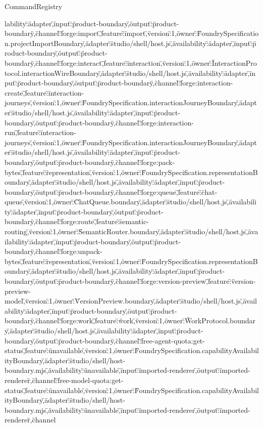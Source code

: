\begin{lexlean}{CommandRegistry}
\begin{semanticmodule}
{lability\":\"adapter\",\"input\":\"product-boundary\",\"output\":\"product-boundary\"},{\"channel\":\"forge:import\",\"feature\":\"import\",\"version\":1,\"owner\":\"FoundrySpecification.projectImportBoundary\",\"adapter\":\"studio/shell/host.js\",\"availability\":\"adapter\",\"input\":\"product-boundary\",\"output\":\"product-boundary\"},{\"channel\":\"forge:interact\",\"feature\":\"interaction\",\"version\":1,\"owner\":\"InteractionProtocol.interactionWireBoundary\",\"adapter\":\"studio/shell/host.js\",\"availability\":\"adapter\",\"input\":\"product-boundary\",\"output\":\"product-boundary\"},{\"channel\":\"forge:interaction-create\",\"feature\":\"interaction-journeys\",\"version\":1,\"owner\":\"FoundrySpecification.interactionJourneyBoundary\",\"adapter\":\"studio/shell/host.js\",\"availability\":\"adapter\",\"input\":\"product-boundary\",\"output\":\"product-boundary\"},{\"channel\":\"forge:interaction-run\",\"feature\":\"interaction-journeys\",\"version\":1,\"owner\":\"FoundrySpecification.interactionJourneyBoundary\",\"adapter\":\"studio/shell/host.js\",\"availability\":\"adapter\",\"input\":\"product-boundary\",\"output\":\"product-boundary\"},{\"channel\":\"forge:pack-bytes\",\"feature\":\"representation\",\"version\":1,\"owner\":\"FoundrySpecification.representationBoundary\",\"adapter\":\"studio/shell/host.js\",\"availability\":\"adapter\",\"input\":\"product-boundary\",\"output\":\"product-boundary\"},{\"channel\":\"forge:queue\",\"feature\":\"chat-queue\",\"version\":1,\"owner\":\"ChatQueue.boundary\",\"adapter\":\"studio/shell/host.js\",\"availability\":\"adapter\",\"input\":\"product-boundary\",\"output\":\"product-boundary\"},{\"channel\":\"forge:route\",\"feature\":\"semantic-routing\",\"version\":1,\"owner\":\"SemanticRouter.boundary\",\"adapter\":\"studio/shell/host.js\",\"availability\":\"adapter\",\"input\":\"product-boundary\",\"output\":\"product-boundary\"},{\"channel\":\"forge:unpack-bytes\",\"feature\":\"representation\",\"version\":1,\"owner\":\"FoundrySpecification.representationBoundary\",\"adapter\":\"studio/shell/host.js\",\"availability\":\"adapter\",\"input\":\"product-boundary\",\"output\":\"product-boundary\"},{\"channel\":\"forge:version-preview\",\"feature\":\"version-preview-model\",\"version\":1,\"owner\":\"VersionPreview.boundary\",\"adapter\":\"studio/shell/host.js\",\"availability\":\"adapter\",\"input\":\"product-boundary\",\"output\":\"product-boundary\"},{\"channel\":\"forge:work\",\"feature\":\"work\",\"version\":1,\"owner\":\"WorkProtocol.boundary\",\"adapter\":\"studio/shell/host.js\",\"availability\":\"adapter\",\"input\":\"product-boundary\",\"output\":\"product-boundary\"},{\"channel\":\"free-agent-quota:get-status\",\"feature\":\"unavailable\",\"version\":1,\"owner\":\"FoundrySpecification.capabilityAvailabilityBoundary\",\"adapter\":\"studio/shell/host-boundary.mjs\",\"availability\":\"unavailable\",\"input\":\"imported-renderer\",\"output\":\"imported-renderer\"},{\"channel\":\"free-model-quota:get-status\",\"feature\":\"unavailable\",\"version\":1,\"owner\":\"FoundrySpecification.capabilityAvailabilityBoundary\",\"adapter\":\"studio/shell/host-boundary.mjs\",\"availability\":\"unavailable\",\"input\":\"imported-renderer\",\"output\":\"imported-renderer\"},{\"channel}
\end{semanticmodule}
\end{lexlean}
